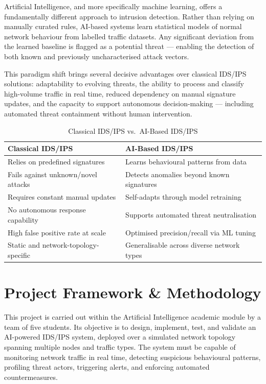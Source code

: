 \documentclass[12pt,a4paper]{report}
\begin{document}
Artificial Intelligence, and more specifically machine learning, offers a fundamentally different
approach to intrusion detection. Rather than relying on manually curated rules, AI-based
systems learn statistical models of normal network behaviour from labelled traffic datasets.
Any significant deviation from the learned baseline is flagged as a potential threat --- enabling
the detection of both known and previously uncharacterised attack vectors.

This paradigm shift brings several decisive advantages over classical IDS/IPS solutions:
adaptability to evolving threats, the ability to process and classify high-volume traffic in real
time, reduced dependency on manual signature updates, and the capacity to support
autonomous decision-making --- including automated threat containment without human
intervention.

\begin{table}[h!]
\centering
\caption{Classical IDS/IPS vs.\ AI-Based IDS/IPS}
\begin{tabular}{@{}L{7cm} L{7cm}@{}}
  \toprule
  \textbf{Classical IDS/IPS} & \textbf{AI-Based IDS/IPS} \\
  \midrule
  Relies on predefined signatures          & Learns behavioural patterns from data \\
  \addlinespace
  Fails against unknown/novel attacks      & Detects anomalies beyond known signatures \\
  \addlinespace
  Requires constant manual updates         & Self-adapts through model retraining \\
  \addlinespace
  No autonomous response capability        & Supports automated threat neutralisation \\
  \addlinespace
  High false positive rate at scale        & Optimised precision/recall via ML tuning \\
  \addlinespace
  Static and network-topology-specific     & Generalisable across diverse network types \\
  \bottomrule
\end{tabular}
\label{tab:ids-comparison}
\end{table}

\chapter{Project Framework \& Methodology}

This project is carried out within the Artificial Intelligence academic module by a team of
five students. Its objective is to design, implement, test, and validate an AI-powered IDS/IPS
system, deployed over a simulated network topology spanning multiple nodes and traffic types.
The system must be capable of monitoring network traffic in real time, detecting suspicious
behavioural patterns, profiling threat actors, triggering alerts, and enforcing automated
countermeasures.
\end{document}
